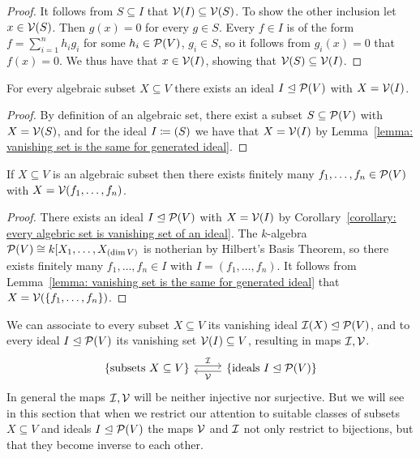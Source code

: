 \begin{proof}
  It follows from $S \subseteq I$ that $\mathcal{V}(I) \subseteq \mathcal{V}(S)$.
  To show the other inclusion let $x \in \mathcal{V}(S)$.
  Then $g(x) = 0$ for every $g \in S$.
  Every $f \in I$ is of the form $f = \sum_{i=1}^n h_i g_i$ for some $h_i \in \mathcal{P}(V)$, $g_i \in S$, so it follows from $g_i(x) = 0$ that $f(x) = 0$.
  We thus have that $x \in \mathcal{V}(I)$, showing that $\mathcal{V}(S) \subseteq \mathcal{V}(I)$.
\end{proof}


\begin{corollary}
  \label{corollary: every algebric set is vanishing set of an ideal}
  For every algebraic subset $X \subseteq V$ there exists an ideal $I \trianglelefteq \mathcal{P}(V)$ with $X = \mathcal{V}(I)$.
\end{corollary}


\begin{proof}
  By definition of an algebraic set, there exist a subset $S \subseteq \mathcal{P}(V)$ with $X = \mathcal{V}(S)$, and for the ideal $I \coloneqq (S)$ we have that $X = \mathcal{V}(I)$ by Lemma~\ref{lemma: vanishing set is the same for generated ideal}.
\end{proof}


\begin{corollary}
  If $X \subseteq V$ is an algebraic subset then there exists finitely many $f_1, \dotsc, f_n \in \mathcal{P}(V)$ with $X = \mathcal{V}(f_1, \dotsc, f_n)$.
\end{corollary}


\begin{proof}
  There exists an ideal $I \trianglelefteq \mathcal{P}(V)$ with $X = \mathcal{V}(I)$ by Corollary~\ref{corollary: every algebric set is vanishing set of an ideal}.
  The $k$-algebra $\mathcal{P}(V) \cong k[X_1, \dotsc, X_{(\dim V)}$ is notherian by Hilbert’s Basis Theorem, so there exists finitely many $f_1, \dotsc, f_n \in I$ with $I = (f_1, \dotsc, f_n)$.
  It follows from Lemma~\ref{lemma: vanishing set is the same for generated ideal} that $X = \mathcal{V}(\{f_1, \dotsc, f_n\})$.
\end{proof}


\begin{fluff}
  We can associate to every subset $X \subseteq V$ its vanishing ideal $\mathcal{I}(X) \trianglelefteq \mathcal{P}(V)$, and to every ideal $I \trianglelefteq \mathcal{P}(V)$ its vanishing set $\mathcal{V}(I) \subseteq V$, resulting in maps $\mathcal{I}, \mathcal{V}$.
  \[
    \begin{tikzcd}
        \{ \text{subsets $X \subseteq V$} \}
        \arrow[shift left]{r}[above]{\mc{I}}
      & \{ \text{ideals $I \idealeq \mc{P}(V)$} \}
        \arrow[shift left]{l}[below]{\mc{V}}
    \end{tikzcd}
  \]
  In general the maps $\mathcal{I}, \mathcal{V}$ will be neither injective nor surjective.
  But we will see in this section that when we restrict our attention to suitable classes of subsets $X \subseteq V$ and ideals $I \trianglelefteq \mathcal{P}(V)$ the maps $\mathcal{V}$ and $\mathcal{I}$ not only restrict to bijections, but that they become inverse to each other.
\end{fluff}


